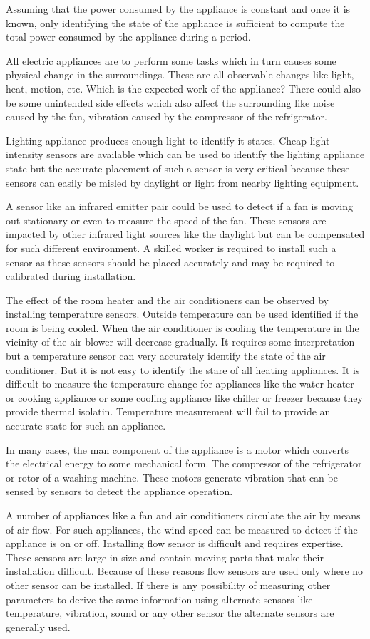 Assuming that the power consumed by the appliance is constant and once it is known, only identifying the state of the appliance is sufficient to compute the total power consumed by the appliance during a period.

All electric appliances are to perform some tasks which in turn causes some physical change in the surroundings. These are all observable changes like light, heat, motion, etc. Which is the expected work of the appliance? There could also be some unintended side effects which also affect the surrounding like noise caused by the fan, vibration caused by the compressor of the refrigerator.

Lighting appliance produces enough light to identify it states. Cheap light intensity sensors are available which can be used to identify the lighting appliance state but the accurate placement of such a sensor is very critical because these sensors can easily be misled by daylight or light from nearby lighting equipment.

A sensor like an infrared emitter pair could be used to detect if a fan is moving out stationary or even to measure the speed of the fan. These sensors are impacted by other infrared light sources like the daylight but can be compensated for such different environment. A skilled worker is required to install such a sensor as these sensors should be placed accurately and may be required to calibrated during installation.

The effect of the room heater and the air conditioners can be observed by installing temperature sensors. Outside temperature can be used identified if the room is being cooled. When the air conditioner is cooling the temperature in the vicinity of the air blower will decrease gradually. It requires some interpretation but a temperature sensor can very accurately identify the state of the air conditioner. But it is not easy to identify the stare of all heating appliances. It is difficult to measure the temperature change for appliances like the water heater or cooking appliance or some cooling appliance like chiller or freezer because they provide thermal isolatin. Temperature measurement will fail to provide an accurate state for such an appliance.

In many cases, the man component of the appliance is a motor which converts the electrical energy to some mechanical form. The compressor of the refrigerator or rotor of a washing machine. These motors generate vibration that can be sensed by sensors to detect the appliance operation.

A number of appliances like a fan and air conditioners circulate the air by means of air flow. For such appliances, the wind speed can be measured to detect if the appliance is on or off. Installing flow sensor is difficult and requires expertise. These sensors are large in size and contain moving parts that make their installation difficult. Because of these reasons flow sensors are used only where no other sensor can be installed. If there is any possibility of measuring other parameters to derive the same information using alternate sensors like temperature, vibration, sound or any other sensor the alternate sensors are generally used.

